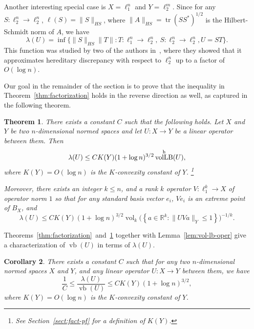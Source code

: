 \documentclass[11pt]{article}
\newtheorem{theorem}{Theorem}
\newtheorem{corollary}[theorem]{Corollary}
\newcommand{\R}{{\mathbb{R}}}
\newcommand{\set}[1]{\left\{ #1 \right\}}
\DeclareMathOperator{\vollb}{volLB}
\DeclareMathOperator{\vb}{vb}
\DeclareMathOperator{\vol}{vol}
\DeclareMathOperator{\tr}{tr}
\begin{document}
Another interesting special case is $X = \ell_1^n$ and $Y =
\ell_2^m$. Since for any $S:\ell_2^n\to \ell_2^n$, $\ell(S) =
\|S\|_{HS}$, where $\|A\|_{HS} = \tr(SS^*)^{1/2}$ is the
Hilbert-Schmidt norm of $A$, we have
\[
\lambda(U) = \inf\{\|S\|_{HS}\|T\|: 
T: \ell_1^n \to \ell_2^n,\ S: \ell_2^n \to \ell_2^n, U = ST\}.
\]
This function was studied by two of the authors in~\cite{NT15}, where
they showed that it approximates hereditary discrepancy with respect
to $\ell_2^n$ up to a factor of $O(\log n)$. 

Our goal in the remainder of the section is to prove that the
inequality in Theorem~\ref{thm:factorization} holds in the reverse
direction as well, as captured in the following theorem.

\begin{theorem}\label{thm:fact-vollb}
  There exists a constant $C$ such that the following holds. Let $X$
  and $Y$ be two $n$-dimensional normed spaces and let $U:X \to Y$ be
  a linear operator between them.
  Then
  \[
  \lambda(U) \le C K(Y) (1 + \log n)^{3/2}\vollb^{\rm h}(U),
  \]
  where $K(Y) = O(\log n)$ is the $K$-convexity constant of $Y$.
  \footnote{See Section~\ref{sect:fact-pf} for a definition of
    $K(Y)$.}  
  
  Moreover, there exists an integer $k\le n$, and a rank $k$ operator
  $V:\ell_1^k\to X$ of operator norm $1$ so that for any standard
  basis vector $e_i$, $Ve_i$ is an extreme point of $B_X$, and
  \[
  \lambda(U) \le C K(Y) (1 + \log n)^{3/2}
  \vol_k\bigl(\set{a \in \R^k: \|UV a\|_Y \le 1}\bigr)^{-1/k}.
  \]
\end{theorem}

Theorems~\ref{thm:factorization}~and~\ref{thm:fact-vollb} together
with Lemma~\ref{lem:vol-lb-oper} give a characterization of $\vb(U)$ in
terms of $\lambda(U)$.

\begin{corollary}\label{cor:vb-apx}
  There exists a constant $C$ such that for any two $n$-dimensional
  normed spaces $X$ and $Y$, and any linear operator $U:X \to Y$
  between them, we have
  \[
  \frac1C \le \frac{\lambda(U)}{\vb(U)} \le C K(Y) (1 + \log n)^{3/2},
  \]
  where $K(Y) = O(\log n)$ is the $K$-convexity constant of $Y$. 
\end{corollary}
\end{document}
